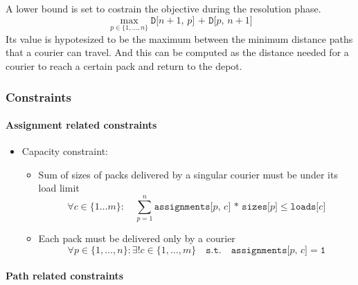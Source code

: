 A lower bound is set to costrain the objective during the resolution phase.
\begin{equation}
    \label{eq:lower_bound}
    \max_{p \in \{ 1, \dots, n \}}
    \texttt{D[$n+1$, $p$] + D[$p$, $n+1$]}
\end{equation}
Its value is hypotesized to be the maximum between the minimum distance paths that a courier can travel. And this can be computed as the distance needed for a courier to reach a certain pack and return to the depot.



\subsubsection{Constraints}

\paragraph*{Assignment related constraints}

\begin{itemize}
    \item Capacity constraint:
    \begin{itemize}
        \item Sum of sizes of packs delivered by a singular courier must be under its load limit
        \begin{equation}
            \label{eq:capacity1}
            \forall c \in \{1 \ldots m\}:
            \quad
            \sum_{p=1}^{n} \texttt{assignments[$p$, $c$] * sizes[$p$]} \leq \texttt{loads[$c$]}
        \end{equation}
        \item Each pack must be delivered only by a courier
        \begin{equation}
            \label{eq:capacity2}
            \forall p \in \{1, \ldots, n\}: \exists! c \in \{1, \ldots, m\} \quad \texttt{s.t.} \quad \texttt{assignments[$p$, $c$]} = \texttt{1}
        \end{equation}
    \end{itemize}
\end{itemize}

\paragraph*{Path related constraints}

